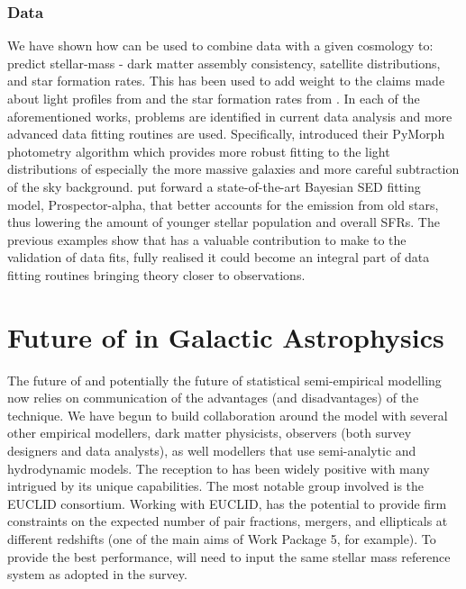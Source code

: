 \subsubsection{Data}

We have shown how \steel can be used to combine data with a given cosmology to: predict stellar-mass - dark matter assembly consistency, satellite distributions, and star formation rates. This has been used to add weight to the claims made about light profiles from \citet{Bernardi2017ComparingLight} and the star formation rates from \citet{Leja2019AnSurvey}. In each of the aforementioned works, problems are identified in current data analysis and more advanced data fitting routines are used. Specifically, \citet{Bernardi2017ComparingLight}  introduced their PyMorph photometry algorithm which provides more robust fitting to the light distributions of especially the more massive galaxies and more careful subtraction of the sky background. \citet{Leja2019AnSurvey} put forward a state-of-the-art Bayesian SED fitting model, Prospector-alpha, that better accounts for the emission from old stars, thus lowering the amount of younger stellar population and overall SFRs. The previous examples show that \steel has a valuable contribution to make to the validation of data fits, fully realised it could become an integral part of data fitting routines bringing theory closer to observations.

\section{Future of \steel in Galactic Astrophysics}
\label{sec:Future}

The future of \steel and potentially the future of statistical semi-empirical modelling now relies on communication of the advantages (and disadvantages) of the technique. We have begun to build collaboration around the model with several other empirical modellers, dark matter physicists, observers (both survey designers and data analysts), as well modellers that use semi-analytic and hydrodynamic models. The reception to \steel has been widely positive with many intrigued by its unique capabilities. The most notable group involved is the EUCLID consortium. Working with EUCLID, \steel has the potential to provide firm constraints on the expected number of pair fractions, mergers, and ellipticals at different redshifts (one of the main aims of Work Package 5, for example). To provide the best performance, \steel will need to input the same stellar mass reference system as adopted in the survey.

